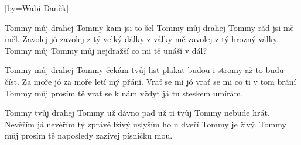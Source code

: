 [by={Wabi Daněk}]

\beginverse{}
Tommy můj drahej Tommy kam jsi to šel
Tommy můj drahej Tommy rád jsi mě měl.
Zavolej jó zavolej z tý velký dálky
z války mě zavolej z tý hrozný války.
Tommy můj Tommy můj nejdražší
co mi tě unáší v dál?
\endverse{}

\beginverse{}
Tommy můj drahej Tommy čekám tvůj list
plakat budou i stromy až to budu číst.
Za moře jó za moře letí mý přání.
Vrať se mi jó vrať se mi co ti v tom brání
Tommy můj prosím tě vrať se k nám
vždyť já tu steskem umírám.
\endverse{}

\beginverse{}
Tommy tvůj drahej Tommy už dávno pad
už ti tvůj Tommy nebude hrát.
Nevěřím já nevěřím tý zprávě lživý
uslyším ho u dveří Tommy je živý.
Tommy můj prosím tě naposledy
zazívej písničku mou.
\endverse{}

\endsong{}
